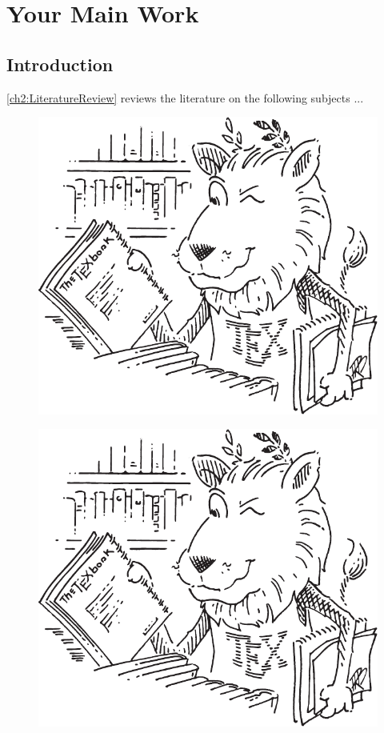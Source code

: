 \chapter{Your Main Work}

\section{Introduction}
\label{ch3:sec:Introduction}
\cref{ch2:LiteratureReview} reviews the literature on the following subjects ...

\begin{figure}[ht]
\centering
\begin{minipage}[t]{0.48\linewidth}
  \centering
  \includegraphics[width=\linewidth]{Figures/Chapter3/ctanlion.pdf}
  \label{fig:fig4}
\end{minipage}
\hfill
\begin{minipage}[t]{0.48\linewidth}
  \centering
  \includegraphics[width=\linewidth]{Figures/Chapter3/ctanlion.pdf}

\end{minipage}
\end{figure}
